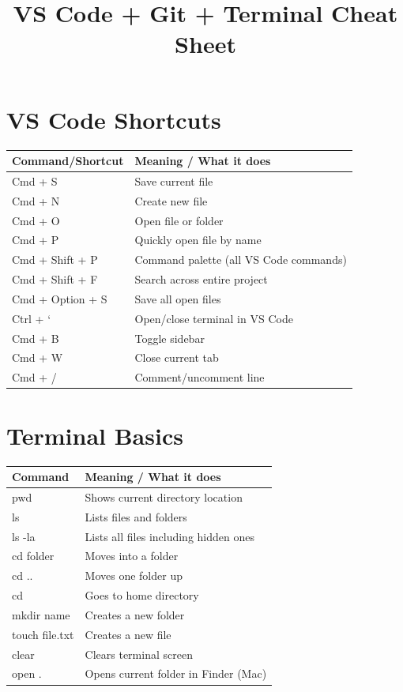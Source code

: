 \documentclass[11pt]{article}
\title{VS Code + Git + Terminal Cheat Sheet}
\date{}
\author{}
\begin{document}
\maketitle

\section*{VS Code Shortcuts}

\renewcommand{\arraystretch}{1.3}

\begin{tabular}{|p{4cm}|p{11cm}|}
\hline
\textbf{Command/Shortcut} & \textbf{Meaning / What it does} \\
\hline
Cmd + S & Save current file \\
Cmd + N & Create new file \\
Cmd + O & Open file or folder \\
Cmd + P & Quickly open file by name \\
Cmd + Shift + P & Command palette (all VS Code commands) \\
Cmd + Shift + F & Search across entire project \\
Cmd + Option + S & Save all open files \\
Ctrl + ` & Open/close terminal in VS Code \\
Cmd + B & Toggle sidebar \\
Cmd + W & Close current tab \\
Cmd + / & Comment/uncomment line \\
\hline
\end{tabular}

\vspace{0.6cm}

\section*{Terminal Basics}

\begin{tabular}{|p{4.5cm}|p{10cm}|}
\hline
\textbf{Command} & \textbf{Meaning / What it does} \\
\hline
pwd & Shows current directory location \\
ls & Lists files and folders \\
ls -la & Lists all files including hidden ones \\
cd folder & Moves into a folder \\
cd .. & Moves one folder up \\
cd ~ & Goes to home directory \\
mkdir name & Creates a new folder \\
touch file.txt & Creates a new file \\
clear & Clears terminal screen \\
open . & Opens current folder in Finder (Mac) \\
\hline
\end{tabular}
\end{document}
